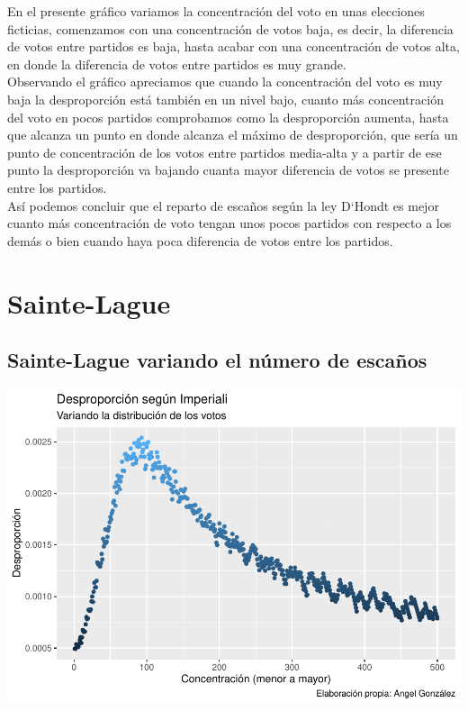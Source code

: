 \documentclass[12pt,a4paper,]{book}
\numberwithin{dummy}{section}
\theoremstyle{ocrenumbox}
\theoremstyle{blacknumex}
\theoremstyle{blacknumbox}
\theoremstyle{ocrenum}
\theoremstyle{ocrenum}
\begin{document}
En el presente gráfico variamos la concentración del voto en unas
elecciones ficticias, comenzamos con una concentración de votos baja, es
decir, la diferencia de votos entre partidos es baja, hasta acabar con
una concentración de votos alta, en donde la diferencia de votos entre
partidos es muy grande.\\
Observando el gráfico apreciamos que cuando la concentración del voto es
muy baja la desproporción está también en un nivel bajo, cuanto más
concentración del voto en pocos partidos comprobamos como la
desproporción aumenta, hasta que alcanza un punto en donde alcanza el
máximo de desproporción, que sería un punto de concentración de los
votos entre partidos media-alta y a partir de ese punto la desproporción
va bajando cuanta mayor diferencia de votos se presente entre los
partidos.\\
Así podemos concluir que el reparto de escaños según la ley D`Hondt es
mejor cuanto más concentración de voto tengan unos pocos partidos con
respecto a los demás o bien cuando haya poca diferencia de votos entre
los partidos.

\hypertarget{sainte-lague}{%
\section{Sainte-Lague}\label{sainte-lague}}

\hypertarget{sainte-lague-variando-el-nuxfamero-de-escauxf1os}{%
\subsection{Sainte-Lague variando el número de
escaños}\label{sainte-lague-variando-el-nuxfamero-de-escauxf1os}}

\begin{center}\includegraphics[width=0.95\linewidth]{figurasR/unnamed-chunk-23-1} \end{center}
\end{document}
